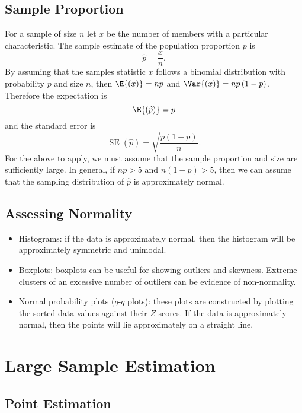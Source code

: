 \documentclass{article}
\begin{document}
\begin{multicols}{3}
\subsection{Sample Proportion}
For a sample of size \(n\) let \(x\) be the number of members with a particular characteristic.
The sample estimate of the population proportion \(p\) is
\begin{equation*}
    \hat{p} = \frac{x}{n}.
\end{equation*}
By assuming that the samples statistic \(x\) follows a binomial distribution with probability \(p\) and
size \(n\), then \(\E{\left( x \right)} = np\) and \(\Var{\left( x \right)} = np\left( 1 - p \right)\).
Therefore the expectation is
\begin{equation*}
    \E{\left( \hat{p} \right)} = p
\end{equation*}
and the standard error is
\begin{equation*}
    \operatorname{SE}{\left( \hat{p} \right)} = \sqrt{\frac{p\left( 1 - p \right)}{n}}.
\end{equation*}
For the above to apply, we must assume that the sample proportion and size are sufficiently large.
In general, if \(np > 5\) and \(n\left( 1 - p \right) > 5\), then we can assume that the sampling distribution of \(\hat{p}\)
is approximately normal.
\subsection{Assessing Normality}
\begin{itemize}
    \item Histograms: if the data is approximately normal, then the histogram will be approximately symmetric and unimodal.
    \item Boxplots: boxplots can be useful for showing outliers and skewness. Extreme clusters of an excessive number of
          outliers can be evidence of non-normality.
    \item Normal probability plots (\(q\)-\(q\) plots): these plots are constructed by plotting the sorted data values against
          their \(Z\)-scores. If the data is approximately normal, then the points will lie approximately on a straight line.
\end{itemize}
\section{Large Sample Estimation}
\subsection{Point Estimation}

\end{multicols}
\end{document}
